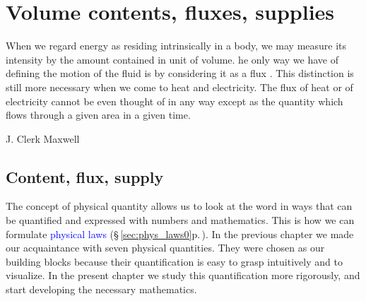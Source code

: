 \documentclass[a4paper,12pt,%
onecolumn,oneside,%
british%
]{memoir}
\newcommand{\mynotew}[1]{{\footnotesize\color{midgrey}\faIcon{tools}\ #1}}
\renewcommand*{\|}[1][]{\nonscript\:#1\vert\nonscript\:\mathopen{}}
\newcommand*{\sect}{\S}%
\renewcommand*{\autoref}[3][\sect\,\ref]{\textcolor{blue}{#3} {\color{blue}\scriptsize(\faIcon[regular]{eye}\;#1{#2}\;p.\,\pageref{#2})}}
\begin{document}
\printpagenotes*
\cleartooddpage
\chapter{Volume contents, fluxes, supplies}
\label{cha:contents_fluxes}


\epigraph{%
When we regard energy as residing intrinsically in a body, we may measure its intensity by the amount contained in unit of volume. he only way we have of defining the motion of the fluid is by considering it as a flux \textelp{}. %
  This distinction is still more necessary when we come to heat and electricity. The flux of heat or of electricity cannot be even thought of in any way except as the quantity which flows through a given area in a given time.%
}{J. Clerk Maxwell \cites*{maxwell1869}}





\section{Content, flux, supply}
\label{sec:contentflux}

The concept of physical quantity allows us to look at the word in ways that can be quantified and expressed with numbers and mathematics. This is how we can formulate \autoref{sec:phys_laws0}{physical laws}. In the previous chapter we made our acquaintance with seven physical quantities. They were chosen as our building blocks because their quantification is easy to grasp intuitively and to visualize. In the present chapter we study this quantification more rigorously, and start developing the necessary mathematics.
\end{document}
